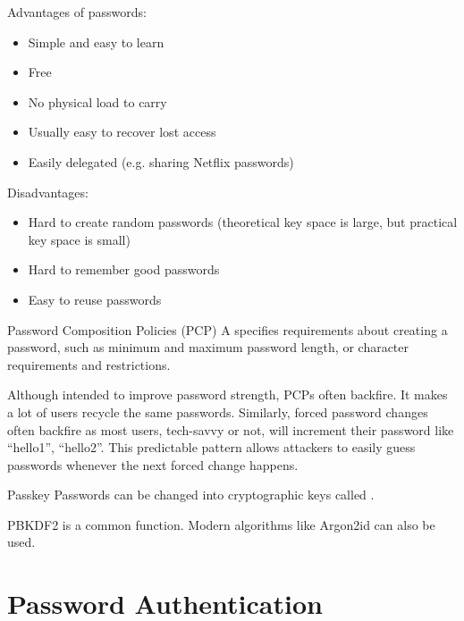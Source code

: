 \documentclass[12pt]{report}
\begin{document}
Advantages of passwords:
\begin{itemize}[noitemsep]
    \item Simple and easy to learn
    \item Free
    \item No physical load to carry
    \item Usually easy to recover lost access
    \item Easily delegated (e.g. sharing Netflix passwords)
\end{itemize}

Disadvantages:
\begin{itemize}
    \item Hard to create random passwords (theoretical key space is large, but practical key space is small)
    \item Hard to remember good passwords
    \item Easy to reuse passwords
\end{itemize}

\begin{dfnbox}{Password Composition Policies (PCP)}{}
    A  specifies requirements about creating a password, such as minimum and maximum password length, or character requirements and restrictions.
\end{dfnbox}

Although intended to improve password strength, PCPs often backfire. It makes a lot of users recycle the same passwords. Similarly, forced password changes often backfire as most users, tech-savvy or not, will increment their password like ``hello1'', ``hello2''. This predictable pattern allows attackers to easily guess passwords whenever the next forced change happens.

\begin{dfnbox}{Passkey}{}
    Passwords can be changed into cryptographic keys called .
\end{dfnbox}

PBKDF2 is a common function. Modern algorithms like Argon2id can also be used.

\section{Password Authentication}
\end{document}
